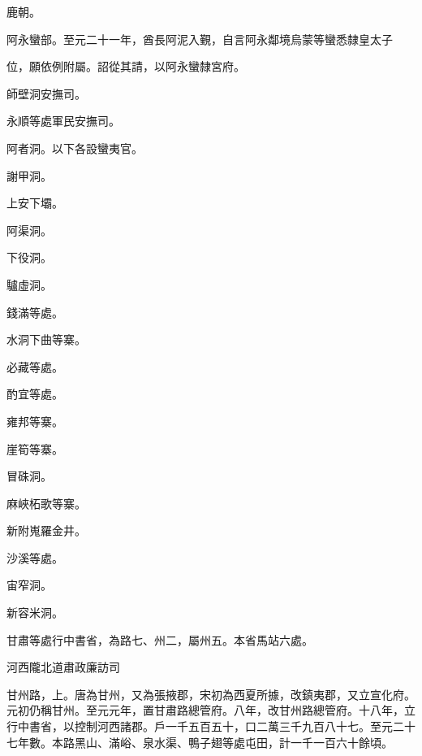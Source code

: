 \begin{pinyinscope}
 鹿朝。



 阿永蠻部。至元二十一年，酋長阿泥入覲，自言阿永鄰境烏蒙等蠻悉隸皇太子



 位，願依例附屬。詔從其請，以阿永蠻隸宮府。



 師壁洞安撫司。



 永順等處軍民安撫司。



 阿者洞。以下各設蠻夷官。



 謝甲洞。



 上安下壩。



 阿渠洞。



 下役洞。



 驢虛洞。



 錢滿等處。



 水洞下曲等寨。



 必藏等處。



 酌宜等處。



 雍邦等寨。



 崖筍等寨。



 冒硃洞。



 麻峽柘歌等寨。



 新附嵬羅金井。



 沙溪等處。



 宙窄洞。



 新容米洞。



 甘肅等處行中書省，為路七、州二，屬州五。本省馬站六處。



 河西隴北道肅政廉訪司



 甘州路，上。唐為甘州，又為張掖郡，宋初為西夏所據，改鎮夷郡，又立宣化府。元初仍稱甘州。至元元年，置甘肅路總管府。八年，改甘州路總管府。十八年，立行中書省，以控制河西諸郡。戶一千五百五十，口二萬三千九百八十七。至元二十七年數。本路黑山、滿峪、泉水渠、鴨子翅等處屯田，計一千一百六十餘頃。




\end{pinyinscope}
